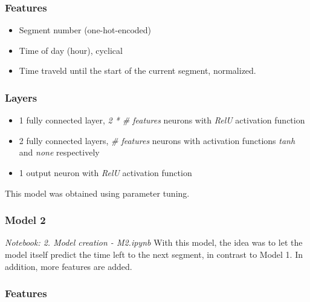 \subsubsection{Features}

\begin{itemize}
    \item Segment number (one-hot-encoded)
    \item Time of day (hour), cyclical
    \item Time traveld until the start of the current segment, normalized.
\end{itemize}



\subsubsection{Layers}

\begin{itemize}
    \item 1 fully connected layer, \textit{2 * \# features} neurons with \textit{RelU} activation function
    \item 2 fully connected layers, \textit{\# features} neurons with activation functions \textit{tanh} and \textit{none} respectively
    \item 1 output neuron with \textit{RelU} activation function
\end{itemize}

This model was obtained using parameter tuning.


\subsubsection{Model 2}\label{M2}
\textit{Notebook: 2. Model creation - M2.ipynb}
\newline
\noindent With this model, the idea was to let the model itself predict the time left to the next segment, in contrast to Model 1. In addition, more features are added.

\subsubsection{Features}

